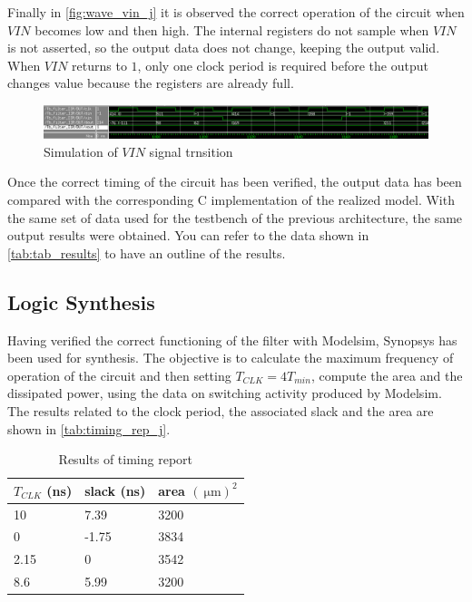 Finally in \autoref{fig:wave_vin_j} it is observed the correct operation of the circuit when $VIN$ becomes low and then high. The internal registers do not sample when $VIN$ is not asserted, so the output data does not change, keeping the output valid. When $VIN$ returns to $1$, only one clock period is required before the output changes value because the registers are already full. 

\begin{figure}[h]
	\center
	\includegraphics[width=1\textwidth]{images/wave_vin_0_1_j_look_ahead.png}
	\caption{Simulation of $VIN$ signal trnsition}
	\label{fig:wave_vin_j}
\end{figure}

Once the correct timing of the circuit has been verified, the output data has been compared with the corresponding C implementation of the realized model. With the same set of data used for the testbench of the previous architecture, the same output results were obtained. You can refer to the data shown in \autoref{tab:tab_results} to have an outline of the results.


\subsection{Logic Synthesis}
Having verified the correct functioning of the filter with Modelsim, Synopsys has been used for synthesis. The objective is to calculate the maximum frequency of operation of the circuit and then setting $T_{CLK} = 4 T_{min}$, compute the area and the dissipated power, using the data on switching activity produced by Modelsim.
The results related to the clock period, the associated slack and the area are shown in \autoref{tab:timing_rep_j}.

\begin{table}[h]
\begin{center}
\begin{tabular}{|l|l|l|}
\hline
$T_{CLK}$ (ns) & slack (ns) & area $(\SI{}{\micro\meter})^2$ \\
\hline
10 & 7.39 &  3200\\
0 & -1.75 &  3834\\
2.15 & 0 & 3542 \\
8.6 & 5.99 & 3200 \\
\hline
\end{tabular}
\end{center}
\caption{Results of timing report}
\label{tab:timing_rep_j}
\end{table}

